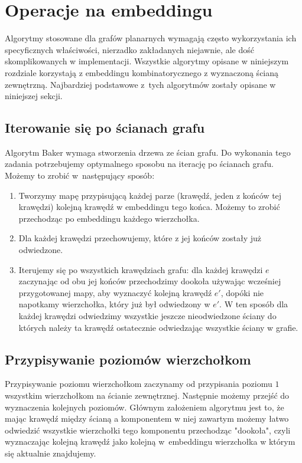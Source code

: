 \documentclass[twoside,a4paper,12pt]{report} %
\theoremstyle{break}
\begin{document}
\section{Operacje na embeddingu}
Algorytmy stosowane dla grafów planarnych wymagają często wykorzystania ich specyficznych właściwości, nierzadko zakładanych niejawnie, ale dość skomplikowanych w implementacji. Wszystkie algorytmy opisane w niniejszym rozdziale korzystają z embeddingu kombinatorycznego z wyznaczoną ścianą zewnętrzną. Najbardziej podstawowe z~tych algorytmów zostały opisane w niniejszej sekcji.

\subsection{Iterowanie się po ścianach grafu}
Algorytm Baker wymaga stworzenia drzewa ze ścian grafu. Do wykonania tego zadania potrzebujemy optymalnego sposobu na iterację po ścianach grafu. Możemy to zrobić w~następujący sposób:

\begin{enumerate}
    \item Tworzymy mapę przypisującą każdej parze (krawędź, jeden z końców tej krawędzi) kolejną krawędź w embeddingu tego końca. Możemy to zrobić przechodząc po embeddingu każdego wierzchołka.
    \item Dla każdej krawędzi przechowujemy, które z jej końców zostały już odwiedzone.
    \item Iterujemy się po wszystkich krawędziach grafu: dla każdej krawędzi $e$ zaczynając od obu jej końców przechodzimy dookoła używając wcześniej przygotowanej mapy, aby wyznaczyć kolejną krawędź $e'$, dopóki nie napotkamy wierzchołka, który już był odwiedzony w $e'$. W ten sposób dla każdej krawędzi odwiedzimy wszystkie jeszcze nieodwiedzone ściany do których należy ta krawędź ostatecznie odwiedzając wszystkie ściany w grafie.
\end{enumerate}

\subsection{Przypisywanie poziomów wierzchołkom}
Przypisywanie poziomu wierzchołkom zaczynamy od przypisania poziomu $1$ wszystkim wierzchołkom na ścianie zewnętrznej. Następnie możemy przejść do wyznaczenia kolejnych poziomów. Głównym założeniem algorytmu jest to, że mając krawędź między ścianą a komponentem w niej zawartym możemy łatwo odwiedzić wszystkie wierzchołki tego komponentu przechodząc "dookoła", czyli wyznaczając kolejną krawędź jako kolejną w~embeddingu wierzchołka w którym się aktualnie znajdujemy. 
\end{document}

